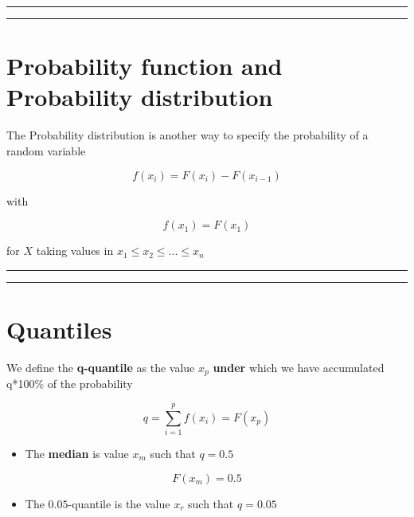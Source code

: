 \documentclass[
]{book}
\providecommand{\tightlist}{%
  \setlength{\itemsep}{0pt}\setlength{\parskip}{0pt}}
\begin{document}
\begin{center}\rule{0.5\linewidth}{0.5pt}\end{center}

\begin{center}\rule{0.5\linewidth}{0.5pt}\end{center}

\hypertarget{probability-function-and-probability-distribution-1}{%
\section{Probability function and Probability distribution}\label{probability-function-and-probability-distribution-1}}

The Probability distribution is another way to specify the probability of a random variable

\[f(x_i)=F(x_i)-F(x_{i-1})\]

with

\[f(x_1)=F(x_1)\]

for \(X\) taking values in \(x_1 \leq x_2 \leq ... \leq x_n\)

\begin{center}\rule{0.5\linewidth}{0.5pt}\end{center}

\begin{center}\rule{0.5\linewidth}{0.5pt}\end{center}

\hypertarget{quantiles}{%
\section{Quantiles}\label{quantiles}}

We define the \textbf{q-quantile} as the value \(x_{p}\) \textbf{under} which we have accumulated q*100\% of the probability

\[q=\sum_{i=1}^p f(x_i) = F (x_p)\]

\begin{itemize}
\tightlist
\item
  The \textbf{median} is value \(x_m\) such that \(q=0.5\)
\end{itemize}

\[F(x_{m})=0.5\]

\begin{itemize}
\tightlist
\item
  The \(0.05\)-quantile is the value \(x_{r}\) such that \(q=0.05\)
\end{itemize}
\end{document}
